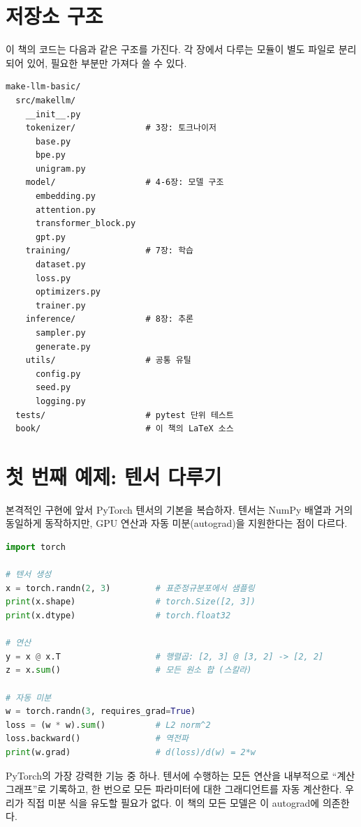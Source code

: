 \section{저장소 구조}

이 책의 코드는 다음과 같은 구조를 가진다. 각 장에서 다루는 모듈이 별도 파일로 분리되어 있어, 필요한 부분만 가져다 쓸 수 있다.

\begin{lstlisting}[style=bashstyle]
make-llm-basic/
  src/makellm/
    __init__.py
    tokenizer/              # 3장: 토크나이저
      base.py
      bpe.py
      unigram.py
    model/                  # 4-6장: 모델 구조
      embedding.py
      attention.py
      transformer_block.py
      gpt.py
    training/               # 7장: 학습
      dataset.py
      loss.py
      optimizers.py
      trainer.py
    inference/              # 8장: 추론
      sampler.py
      generate.py
    utils/                  # 공통 유틸
      config.py
      seed.py
      logging.py
  tests/                    # pytest 단위 테스트
  book/                     # 이 책의 LaTeX 소스
\end{lstlisting}

\section{첫 번째 예제: 텐서 다루기}

본격적인 구현에 앞서 PyTorch 텐서의 기본을 복습하자. 텐서는 NumPy 배열과 거의 동일하게 동작하지만, GPU 연산과 자동 미분(autograd)을 지원한다는 점이 다르다.

\begin{lstlisting}[language=Python]
import torch

# 텐서 생성
x = torch.randn(2, 3)         # 표준정규분포에서 샘플링
print(x.shape)                # torch.Size([2, 3])
print(x.dtype)                # torch.float32

# 연산
y = x @ x.T                   # 행렬곱: [2, 3] @ [3, 2] -> [2, 2]
z = x.sum()                   # 모든 원소 합 (스칼라)

# 자동 미분
w = torch.randn(3, requires_grad=True)
loss = (w * w).sum()          # L2 norm^2
loss.backward()               # 역전파
print(w.grad)                 # d(loss)/d(w) = 2*w
\end{lstlisting}

\begin{infobox}[자동 미분 (Autograd)]
PyTorch의 가장 강력한 기능 중 하나. 텐서에 수행하는 모든 연산을 내부적으로 ``계산 그래프''로 기록하고,  한 번으로 모든 파라미터에 대한 그래디언트를 자동 계산한다. 우리가 직접 미분 식을 유도할 필요가 없다. 이 책의 모든 모델은 이 autograd에 의존한다.
\end{infobox}

